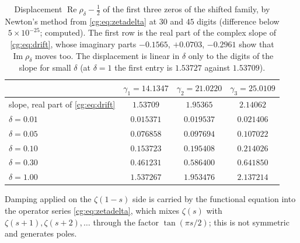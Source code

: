 \begin{table}[ht]
\centering
\begin{tabular}{lccc}
\toprule
 & $\gamma_1=14.1347$ & $\gamma_2=21.0220$ & $\gamma_3=25.0109$\\
\midrule
slope, real part of \eqref{cg:eq:drift} & $1.53709$ & $1.95365$ & $2.14062$\\
$\delta=0.01$ & $0.015371$ & $0.019537$ & $0.021406$\\
$\delta=0.05$ & $0.076858$ & $0.097694$ & $0.107022$\\
$\delta=0.10$ & $0.153723$ & $0.195408$ & $0.214026$\\
$\delta=0.30$ & $0.461231$ & $0.586400$ & $0.641850$\\
$\delta=1.00$ & $1.537267$ & $1.953476$ & $2.137214$\\
\bottomrule
\end{tabular}
\caption{Displacement $\operatorname{Re}\rho_\delta-\frac12$ of the first three zeros of the shifted family, by Newton's method from \eqref{cg:eq:zetadelta} at $30$ and $45$ digits (difference below $5\times10^{-25}$; computed). The first row is the real part of the complex slope of \eqref{cg:eq:drift}, whose imaginary parts $-0.1565$, $+0.0703$, $-0.2961$ show that $\operatorname{Im}\rho_\delta$ moves too. The displacement is linear in $\delta$ only to the digits of the slope for small $\delta$ (at $\delta=1$ the first entry is $1.53727$ against $1.53709$).}
\label{cg:tab:drift}
\end{table}

Damping applied on the $\zeta(1-s)$ side is carried by the functional equation into the operator series \eqref{cg:eq:zetadelta}, which mixes $\zeta(s)$ with $\zeta(s+1),\zeta(s+2),\dots$ through the factor $\tan(\pi s/2)$; this is not symmetric and generates poles.

